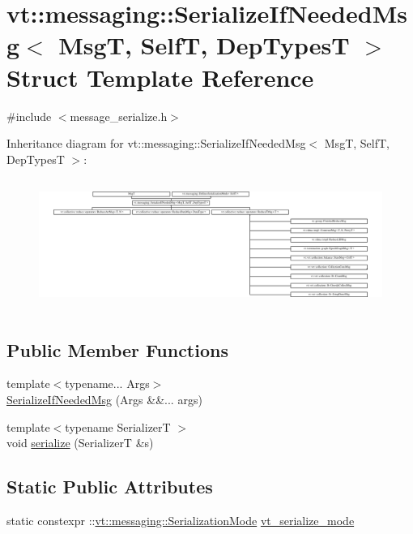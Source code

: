 \hypertarget{structvt_1_1messaging_1_1_serialize_if_needed_msg}{}\section{vt\+:\+:messaging\+:\+:Serialize\+If\+Needed\+Msg$<$ MsgT, SelfT, Dep\+TypesT $>$ Struct Template Reference}
\label{structvt_1_1messaging_1_1_serialize_if_needed_msg}


{\ttfamily \#include $<$message\+\_\+serialize.\+h$>$}

Inheritance diagram for vt\+:\+:messaging\+:\+:Serialize\+If\+Needed\+Msg$<$ MsgT, SelfT, Dep\+TypesT $>$\+:\begin{figure}[H]
\begin{center}
\leavevmode
\includegraphics[height=4.296675cm]{structvt_1_1messaging_1_1_serialize_if_needed_msg}
\end{center}
\end{figure}
\subsection*{Public Member Functions}
\begin{DoxyCompactItemize}
\item 
{\footnotesize template$<$typename... Args$>$ }\\\hyperlink{structvt_1_1messaging_1_1_serialize_if_needed_msg_aeca13b16b58fca6e1987d5d19d57b3b8}{Serialize\+If\+Needed\+Msg} (Args \&\&... args)
\item 
{\footnotesize template$<$typename SerializerT $>$ }\\void \hyperlink{structvt_1_1messaging_1_1_serialize_if_needed_msg_acaf8965385e80bbbaabc8d335fe90eed}{serialize} (SerializerT \&s)
\end{DoxyCompactItemize}
\subsection*{Static Public Attributes}
\begin{DoxyCompactItemize}
\item 
static constexpr \+::\hyperlink{namespacevt_1_1messaging_a436c5b9fc7f591e5978a136999cb9ef8}{vt\+::messaging\+::\+Serialization\+Mode} \hyperlink{structvt_1_1messaging_1_1_serialize_if_needed_msg_aae6c39c834f1aa059dadd77324ca750b}{vt\+\_\+serialize\+\_\+mode}
\end{DoxyCompactItemize}


